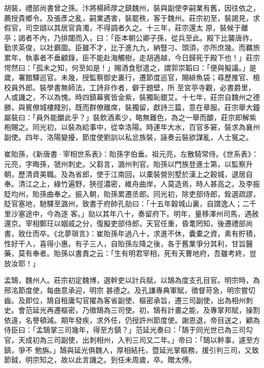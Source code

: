 \begin{pinyinscope}
 胡裝，禮部尚書曾之孫。汴將楊師厚之鎮魏州，裝與副使李嗣業有舊，因往依之，薦授貴鄉令。及張彥之亂，嗣業遇害，裝罷秩，客于魏州。莊宗初至，裝謁見，求假官，司空頲以其居官貪濁，不得調者久之。十三年，莊宗還太
 原，裝候于離亭；謁者不內，乃排闥而入，曰：「臣本朝公卿子孫，從兵至此。殿下比襲唐祚，勤求英俊，以壯霸圖。臣雖不才，比于進九九，納豎刁、頭須，亦所庶幾。而羈旅累年，執事者不垂顧錄，臣不能赴海觸樹，走胡適越，今日歸死于殿下也！」莊宗愕然曰：「孤未之知，何至如是！」賜酒食慰遣之，謂郭崇韜曰：「便與擬議。」是歲，署館驛巡官。未幾，授監察御史裏行，遷節度巡官，賜緋魚袋；尋歷推官、檢校員外郎。裝學書無師法，工詩非作者，僻于題壁，所
 至宮亭寺觀，必書爵里，人或譏之，不以為愧。時四鎮幕賓皆金紫，裝獨恥銀艾。十七年，莊宗自魏州之德勝，與賓僚城樓餞別，既而群僚離席，裝獨留，獻詩三篇，意在章服。莊宗舉大鐘屬裝曰：「員外能釂此乎？」裝飲酒素少，略無難色，為之一舉而釂，莊宗即解紫袍賜之。同光初，以裝為給事中，從幸洛陽。時連年大水，百官多窘，裝求為襄州副使。四年，洛陽變擾，節度使劉訓以私忿族裝，誣奏云裝欲謀亂，人士冤之。



 崔貽孫，《新唐書·宰相世系表》：貽孫字伯垂。祖元亮，左散騎常侍。《世系表》：元亮，字晦孫，虢州刺史。父芻言，潞州判官。貽孫以門族登進士第，以監察升朝，歷清資美職。及為省郎，使于江南回，以橐裝營別墅於漢上之穀城，退居自奉。清江之上，綠竹遍野，狹徑濃密，維舟曲岸，人莫造焉，時人甚高之。及李振貶均州，貽孫曲奉之。振入朝，貽孫累遷丞郎。同光初，除吏部侍郎，銓選疏謬，貶官塞地，馳驛至潞州，致書于府帥孔勍曰：「十五年穀城山裏，自謂逸人；二千里沙塞途中，今為逐
 客。」勍以其年八十，奏留府下。明年，量移澤州司馬，遇赦還京。宰相鄭玨以姻戚之分，復擬吏部侍郎，天官任重，昏耄罔知，後遷禮部尚書，致仕而卒。《北夢瑣言》：崔貽孫年過八十，求進不休，囊橐之資，素有貯積，性好干人，喜得小惠。有子三人，自貽孫左降之後，各于舊業爭分其利，甘旨醫藥，莫有奉者。貽孫以書責之云：「生有明君宰相，死有天曹地府，吾雖考終，豈放汝耶！」



 孟鵠，魏州人。莊宗初定魏博，選幹吏以計兵賦，以鵠為度支孔目官。明宗時，為邢洺節度使，每曲意承迎，明宗
 甚德之。及孔謙專典軍賦，徵督苛急，明宗嘗切齒。及即位，鵠自租庸勾官擢為客省副使、樞密承旨，遷三司副使，出為相州刺史。會范延光再遷樞密，乃徵鵠為三司使。初，鵠有計畫之能，及專掌邦賦，操割依違，名譽頓減。期年發疾，求外任，仍授許州節度使。謝恩退，帝目送之，顧為侍臣曰：「孟鵠掌三司幾年，得至方鎮？」范延光奏曰：「鵠于同光世已為三司勾官，天成初為三司副使，出刺相州，入判三司又二年。」帝曰：「鵠以幹事，遽至方鎮，爭不
 勉旃。」鵠與延光俱魏人，厚相結托，暨延光掌樞務，援引判三司，又致節鉞，明宗知之，故以此言譏之。到任未周歲，卒。贈太傅。




\end{pinyinscope}

